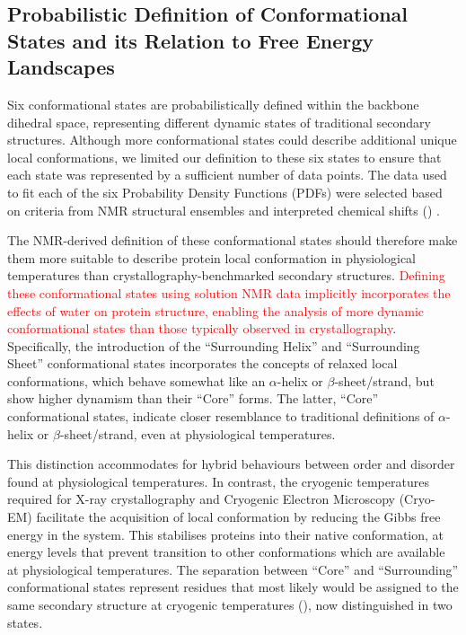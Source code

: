 \subsection{Probabilistic Definition of Conformational States and its Relation to Free Energy Landscapes}

Six conformational states are probabilistically defined within the backbone dihedral space, representing different dynamic states of traditional secondary structures. Although more conformational states could describe additional unique local conformations, we limited our definition to these six states to ensure that each state was represented by a sufficient number of data points. The data used to fit each of the six Probability Density Functions (PDFs) were selected based on criteria from NMR structural ensembles and interpreted chemical shifts () \cite{orlando_shiftcrypt_2020}. 

The NMR-derived definition of these conformational states should therefore make them more suitable to describe protein local conformation in physiological temperatures than crystallography-benchmarked secondary structures. \textcolor{red}{Defining these conformational states using solution NMR data implicitly incorporates the effects of water on protein structure, enabling the analysis of more dynamic conformational states than those typically observed in crystallography}. Specifically, the introduction of the ``Surrounding Helix'' and ``Surrounding Sheet'' conformational states incorporates the concepts of relaxed local conformations, which behave somewhat like an $\alpha$-helix or $\beta$-sheet/strand, but show higher dynamism than their ``Core'' forms. The latter, ``Core'' conformational states, indicate closer resemblance to traditional definitions of $\alpha$-helix or $\beta$-sheet/strand, even at physiological temperatures. 

This distinction accommodates for hybrid behaviours between order and disorder found at physiological temperatures. In contrast, the cryogenic temperatures required for X-ray crystallography and Cryogenic Electron Microscopy (Cryo-EM) facilitate the acquisition of local conformation by reducing the Gibbs free energy in the system. This stabilises proteins into their native conformation, at energy levels that prevent transition to other conformations which are available at physiological temperatures. The separation between ``Core'' and ``Surrounding'' conformational states represent residues that most likely would be assigned to the same secondary structure at cryogenic temperatures (), now distinguished in two states. 

